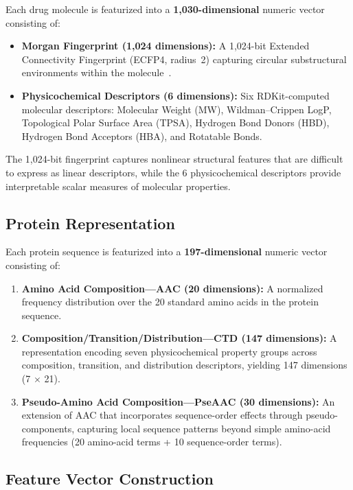 \documentclass[10pt,conference]{IEEEtran}
\begin{document}
Each drug molecule is featurized into a \textbf{1,030-dimensional} numeric vector consisting of:

\begin{itemize}[leftmargin=*, itemsep=0pt]
    \item \textbf{Morgan Fingerprint (1,024 dimensions):} A 1,024-bit Extended Connectivity Fingerprint (ECFP4, radius~2) capturing circular substructural environments within the molecule~\cite{rogers2010}.
    \item \textbf{Physicochemical Descriptors (6 dimensions):} Six RDKit-computed molecular descriptors: Molecular Weight (MW), Wildman--Crippen LogP, Topological Polar Surface Area (TPSA), Hydrogen Bond Donors (HBD), Hydrogen Bond Acceptors (HBA), and Rotatable Bonds.
\end{itemize}

The 1,024-bit fingerprint captures nonlinear structural features that are difficult to express as linear descriptors, while the 6 physicochemical descriptors provide interpretable scalar measures of molecular properties.

\subsection{Protein Representation}
\label{subsec:protein}

Each protein sequence is featurized into a \textbf{197-dimensional} numeric vector consisting of:

\begin{enumerate}[leftmargin=*, itemsep=0pt]
    \item \textbf{Amino Acid Composition---AAC (20 dimensions):} A normalized frequency distribution over the 20 standard amino acids in the protein sequence.
    \item \textbf{Composition/Transition/Distribution---CTD (147 dimensions):} A representation encoding seven physicochemical property groups across composition, transition, and distribution descriptors, yielding 147 dimensions (7 $\times$ 21).
    \item \textbf{Pseudo-Amino Acid Composition---PseAAC (30 dimensions):} An extension of AAC that incorporates sequence-order effects through pseudo-components, capturing local sequence patterns beyond simple amino-acid frequencies (20 amino-acid terms + 10 sequence-order terms).
\end{enumerate}

\subsection{Feature Vector Construction}
\label{subsec:feature}
\end{document}
